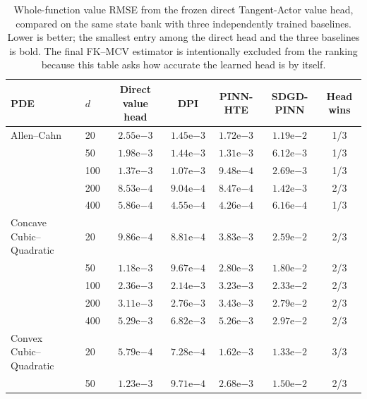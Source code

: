 \begin{table}[t]
\centering
\caption{Whole-function value RMSE from the frozen direct Tangent-Actor value head, compared on the same state bank with three independently trained baselines. Lower is better; the smallest entry among the direct head and the three baselines is bold. The final FK--MCV estimator is intentionally excluded from the ranking because this table asks how accurate the learned head is by itself.}
\label{tab:value-head-full-dimension}
\small
\setlength{\tabcolsep}{5.2pt}
\begin{tabular}{llccccc}
\toprule
PDE & $d$ & Direct value head & DPI & PINN-HTE & SDGD-PINN & Head wins \\
\midrule
Allen--Cahn & 20 & $2.55\mathrm{e}{-3}$ & \textbf{$1.45\mathrm{e}{-3}$} & $1.72\mathrm{e}{-3}$ & $1.19\mathrm{e}{-2}$ & 1/3 \\
 & 50 & $1.98\mathrm{e}{-3}$ & $1.44\mathrm{e}{-3}$ & \textbf{$1.31\mathrm{e}{-3}$} & $6.12\mathrm{e}{-3}$ & 1/3 \\
 & 100 & $1.37\mathrm{e}{-3}$ & $1.07\mathrm{e}{-3}$ & \textbf{$9.48\mathrm{e}{-4}$} & $2.69\mathrm{e}{-3}$ & 1/3 \\
 & 200 & $8.53\mathrm{e}{-4}$ & $9.04\mathrm{e}{-4}$ & \textbf{$8.47\mathrm{e}{-4}$} & $1.42\mathrm{e}{-3}$ & 2/3 \\
 & 400 & $5.86\mathrm{e}{-4}$ & $4.55\mathrm{e}{-4}$ & \textbf{$4.26\mathrm{e}{-4}$} & $6.16\mathrm{e}{-4}$ & 1/3 \\
\addlinespace[2pt]
Concave Cubic--Quadratic & 20 & $9.86\mathrm{e}{-4}$ & \textbf{$8.81\mathrm{e}{-4}$} & $3.83\mathrm{e}{-3}$ & $2.59\mathrm{e}{-2}$ & 2/3 \\
 & 50 & $1.18\mathrm{e}{-3}$ & \textbf{$9.67\mathrm{e}{-4}$} & $2.80\mathrm{e}{-3}$ & $1.80\mathrm{e}{-2}$ & 2/3 \\
 & 100 & $2.36\mathrm{e}{-3}$ & \textbf{$2.14\mathrm{e}{-3}$} & $3.23\mathrm{e}{-3}$ & $2.33\mathrm{e}{-2}$ & 2/3 \\
 & 200 & $3.11\mathrm{e}{-3}$ & \textbf{$2.76\mathrm{e}{-3}$} & $3.43\mathrm{e}{-3}$ & $2.79\mathrm{e}{-2}$ & 2/3 \\
 & 400 & $5.29\mathrm{e}{-3}$ & $6.82\mathrm{e}{-3}$ & \textbf{$5.26\mathrm{e}{-3}$} & $2.97\mathrm{e}{-2}$ & 2/3 \\
\addlinespace[2pt]
Convex Cubic--Quadratic & 20 & \textbf{$5.79\mathrm{e}{-4}$} & $7.28\mathrm{e}{-4}$ & $1.62\mathrm{e}{-3}$ & $1.33\mathrm{e}{-2}$ & 3/3 \\
 & 50 & $1.23\mathrm{e}{-3}$ & \textbf{$9.71\mathrm{e}{-4}$} & $2.68\mathrm{e}{-3}$ & $1.50\mathrm{e}{-2}$ & 2/3 \\

\end{tabular}
\end{table}
